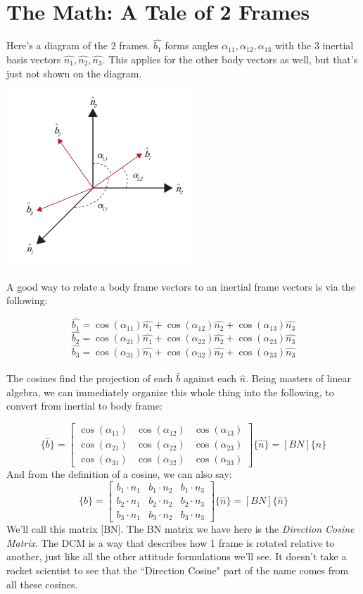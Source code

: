 \documentclass[a4paper,14pt]{extreport}
\newcommand{\bv}[1]{\hat{b_{#1}}}
\newcommand{\nv}[1]{\hat{n_{#1}}}
\begin{document}
\section{The Math: A Tale of 2 Frames}
Here's a diagram of the 2 frames. $\bv{1}$ forms angles $\alpha_{11}, \alpha_{12}, \alpha_{13}$ with the 3 inertial basis vectors $\nv{1},\nv{2},\nv{3}$. This applies for the other body vectors as well, but that's just not shown on the diagram.
\begin{center}
\includegraphics[width=7cm]{dcmalpha}
\end{center}
A good way to relate a body frame vectors to an inertial frame vectors is via the following:

\[\bv{1} = \cos(\alpha_{11})\nv{1} + \cos(\alpha_{12})\nv{2} + \cos(\alpha_{13})\nv{3}\]
\[\bv{2} = \cos(\alpha_{21})\nv{1} + \cos(\alpha_{22})\nv{2} + \cos(\alpha_{23})\nv{3}\]
\[\bv{3} = \cos(\alpha_{31})\nv{1} + \cos(\alpha_{32})\nv{2} + \cos(\alpha_{33})\nv{3}\]
\\
The cosines find the projection of each $\hat{b}$ against each $\hat{n}$. Being masters of linear algebra, we can immediately organize this whole thing into the following, to convert from inertial to body frame:

\[
\{\hat{b}\} = \begin{bmatrix}
\cos(\alpha_{11})&\cos(\alpha_{12})&\cos(\alpha_{13}) \\
\cos(\alpha_{21})&\cos(\alpha_{22})&\cos(\alpha_{23}) \\
\cos(\alpha_{31})&\cos(\alpha_{32})&\cos(\alpha_{33})
\end{bmatrix} \{\hat{n}\} = [BN] \{\hat{n}\}
\]
And from the definition of a cosine, we can also say:
\[
\{\hat{b}\} = \begin{bmatrix}
b_1 \cdot n_1 & b_1 \cdot n_2 & b_1 \cdot n_3 \\
b_2 \cdot n_1 & b_2 \cdot n_2 & b_2 \cdot n_3 \\
b_3 \cdot n_1 & b_3 \cdot n_2 & b_3 \cdot n_3
\end{bmatrix} \{\hat{n}\} = [BN] \{\hat{n}\}
\]
We'll call this matrix [BN]. The BN matrix we have here is the \emph{Direction Cosine Matrix}. The DCM is a way that describes how 1 frame is rotated relative to another, just like all the other attitude formulations we'll see. It doesn't take a rocket scientist to see that the ``Direction Cosine" part of the name comes from all these cosines.
\end{document}
